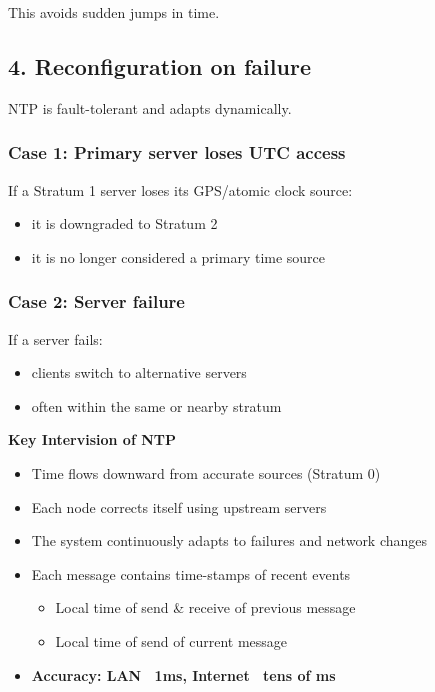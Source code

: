 This avoids sudden jumps in time.



\subsection{4. Reconfiguration on failure}

NTP is fault-tolerant and adapts dynamically.



\subsubsection{Case 1: Primary server loses UTC access}

If a Stratum 1 server loses its GPS/atomic clock source:

\begin{itemize}
    \item it is downgraded to Stratum 2
    \item it is no longer considered a primary time source
\end{itemize}



\subsubsection{Case 2: Server failure}

If a server fails:

\begin{itemize}
    \item clients switch to alternative servers
    \item often within the same or nearby stratum
\end{itemize}


\begin{mdframed}[backgroundcolor=lightgray, linewidth=0pt, innertopmargin=8pt,
innerbottommargin=8pt]
\textbf{Key Intervision of NTP}
\begin{itemize}
    \item Time flows downward from accurate sources (Stratum 0)
    \item Each node corrects itself using upstream servers
    \item The system continuously adapts to failures and network changes
    \item Each message contains time-stamps of recent events
    \begin{itemize}
        \item Local time of send \& receive of previous message
        \item Local time of send of current message
    \end{itemize}
    \item \textbf{Accuracy: LAN ~1ms, Internet ~tens of ms}
\end{itemize}
\end{mdframed}


